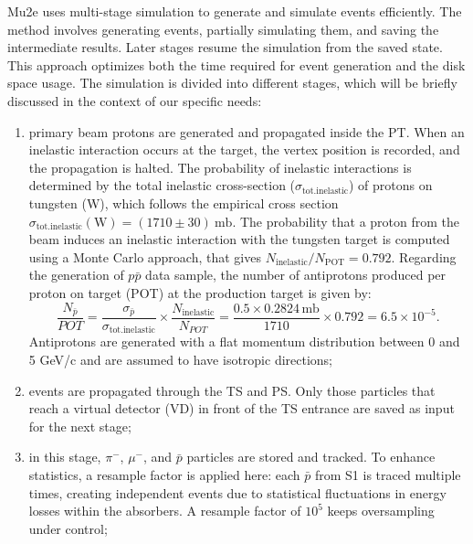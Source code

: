 Mu2e uses multi-stage simulation 
to generate and simulate events efficiently. 
The method involves generating 
events, partially simulating them, and saving the intermediate results.
Later stages resume the simulation from the saved 
state. This approach optimizes both the 
time required for event generation 
and the disk space usage.
The simulation is divided into different stages, which will be 
briefly discussed in the context of our specific needs:

\begin{enumerate}
    \item primary beam protons are 
    generated and propagated 
    inside the PT. When an inelastic interaction 
    occurs at the target, the vertex 
    position is recorded, and the propagation 
    is halted. The probability of 
    inelastic interactions is determined by 
    the total inelastic cross-section 
    ($\sigma_{\text{tot.inelastic}}$) of 
    protons on tungsten (W), which follows the 
    empirical cross section $\sigma_{\text{tot.inelastic}}(\text{W}) = (1710 \pm 30) \ \text{mb}$.
    The probability that a proton from the beam 
    induces an inelastic interaction 
    with the tungsten target is computed using a 
    Monte Carlo approach, that gives 
    $N_{\text{inelastic}}/N_{\text{POT}} = 0.792$. 
    Regarding the generation of $p\bar{p}$ 
    data sample, the number of antiprotons produced 
    per proton on target (POT) at the production target is given by:
    $$
    \frac{N_{\bar{p}}}{POT} = \frac{\sigma_{\bar{p}}}{\sigma_{\text{tot.inelastic}}} \times \frac{N_{\text{inelastic}}}{N_{POT}} = \frac{0.5 \times 0.2824 \, \text{mb}}{1710} \times 0.792 = 6.5 \times 10^{-5}.
    $$
    Antiprotons are generated with a flat momentum 
    distribution between 0 and 5 GeV/c and 
    are assumed to have isotropic directions;
    
    \item events are propagated through the TS and PS. 
    Only those particles that reach a virtual detector (VD) in front 
    of the TS entrance are saved as input for the next stage;

    \item in this stage, $\pi^-$, $\mu^-$, and $\bar{p}$ 
    particles are stored and tracked. To enhance statistics, a resample factor 
    is applied here: each $\bar{p}$ from S1 is traced multiple times, creating 
    independent events due to statistical fluctuations in energy losses within 
    the absorbers. A resample factor of $10^5$ keeps oversampling under control;


\end{enumerate}
